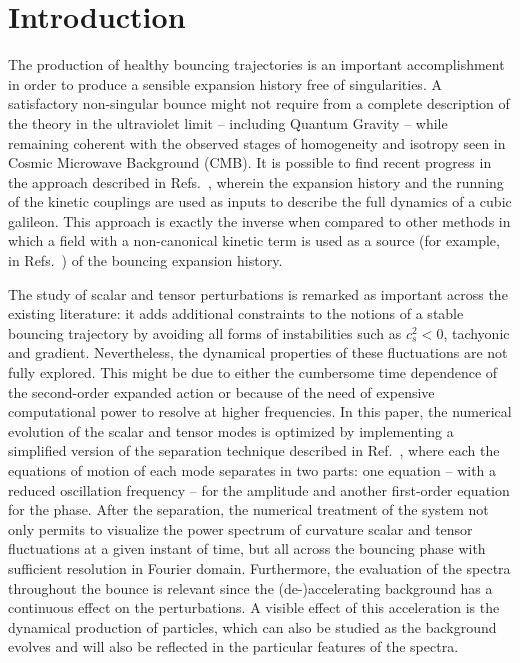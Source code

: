 \documentclass[aps,prd,reprint,twocolumn,showpacs,nofootinbib,superscriptaddress,floatfix]{revtex4-1}
\begin{document}
\section{Introduction}
The production of healthy bouncing trajectories is an important accomplishment in order to produce a sensible expansion history free of singularities. A satisfactory non-singular bounce might not require from a complete description of the theory in the ultraviolet limit -- including Quantum Gravity -- while remaining coherent with the observed stages of homogeneity and isotropy seen in Cosmic Microwave Background (CMB). It is possible to find recent progress in the approach described in Refs.~\cite{Ijjas:2016tpn, Ijjas:2016vtq}, wherein the expansion history and the running of the kinetic couplings are used as inputs to describe the full dynamics of a cubic galileon. This approach is exactly the inverse when compared to other methods in which a field with a non-canonical kinetic term is used as a source (for example, in Refs.~\cite{Deffayet:2010qz, Easson:2011zy}) of the bouncing expansion history.  

The study of scalar and tensor perturbations is remarked as important across the existing literature: it adds additional constraints to the notions of a stable bouncing trajectory by avoiding all forms of instabilities such as $c_s^2<0$, tachyonic and gradient. Nevertheless, the dynamical properties of these fluctuations are not fully explored. This might be due to either the cumbersome time dependence of the second-order expanded action or because of the need of expensive computational power to resolve at higher frequencies. In this paper, the numerical evolution of the scalar and tensor modes is optimized by implementing a simplified version of the separation technique described in Ref.~\cite{Ghersi:2016gee}, where each the equations of motion of each mode separates in two parts: one equation -- with a reduced oscillation frequency -- for the amplitude and another first-order equation for the phase. After the separation, the numerical treatment of the system not only permits to visualize the power spectrum of curvature scalar and tensor fluctuations at a given instant of time, but all across the bouncing phase with sufficient resolution in Fourier domain. Furthermore, the evaluation of the spectra throughout the bounce is relevant since the (de-)accelerating background has a continuous effect on the perturbations. A visible effect of this acceleration is the dynamical production of particles, which can also be studied as the background evolves and will also be reflected in the particular features of the spectra.              
\end{document}
